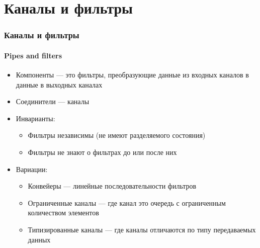 \documentclass{../cscslides}
\begin{document}
    \section{Каналы и фильтры}

    \begin{frame}
        \frametitle{Каналы и фильтры}
        \framesubtitle{Pipes and filters}
        \begin{itemize}
            \item Компоненты --- это фильтры, преобразующие данные из входных каналов в данные в выходных каналах
            \item Соединители --- каналы
            \item Инварианты:
            \begin{itemize}
                \item Фильтры независимы (не имеют разделяемого состояния)
                \item Фильтры не знают о фильтрах до или после них
            \end{itemize}
            \item Вариации:
            \begin{itemize}
                \item Конвейеры --- линейные последовательности фильтров
                \item Ограниченные каналы --- где канал это очередь с ограниченным количеством элементов
                \item Типизированные каналы --- где каналы отличаются по типу передаваемых данных
            \end{itemize}
        \end{itemize}
    \end{frame}
\end{document}
